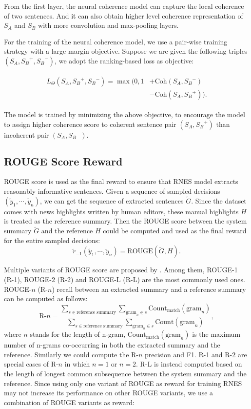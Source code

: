 	From the first layer, the neural coherence model can capture the local coherence of two sentences.  And it can also obtain higher level coherence representation of $S_A$ and $S_B$ with more convolution and max-pooling layers.

	For the training of the neural coherence model, we use a pair-wise training strategy with a large margin objective. Suppose we are given the following triples $(S_A, {S_B}^{+},{S_B}^{-})$, we adopt the ranking-based loss as objective:

\begin{align*}
	\begin{split}
	L_\Theta({S_A}, {S_B}^+, {S_B}^-) = 
	\max(0, 1 &+\text{Coh}({S_A, {S_B}^-})\\
	&-\text{Coh}({S_A}, {S_B}^+)).
	\end{split}

	\end{align*}

	The model is trained by minimizing the above objective, to encourage the model to assign higher coherence score to coherent sentence pair $(S_A, {S_B}^+)$ than incoherent pair $({S_A}, {S_B}^-)$.

	\subsection{ROUGE Score Reward}
	\label{rsr}
	ROUGE score is used as the final reward to ensure that RNES model extracts reasonably informative sentences. Given a sequence of sampled decisions $(\tilde{y}_1, \cdots, \tilde{y}_n)$, we can get the sequence of extracted sentences $\tilde{G}$. Since the dataset comes with news highlights written by human editors, these manual highlights $H$ is treated as the reference summary. Then the ROUGE score between the system summary $\tilde{G}$ and the reference $H$  could be computed and used as the final reward for the entire sampled decisions:
	\[ \tilde{r}_{-1}(\tilde{y}_1, \cdots, \tilde{y}_n) = \text{ROUGE}(\tilde{G}, H). \]

	Multiple variants of ROUGE score are proposed by \cite{rouge}. Among them, ROUGE-1 (R-1), ROUGE-2 (R-2) and ROUGE-L (R-L) are the most commonly used ones. ROUGE-$n$ (R-$n$) recall between an extracted summary and a reference summary can be computed as follows:
	\[ \text{R-}n = \frac{\sum_{s\in\text{reference summary}} \sum_{\text{gram}_n \in s} \text{Count}_{\text{match}} (\text{gram}_n) }{\sum_{s\in\text{reference summary}} \sum_{\text{gram}_n \in s} \text{Count} (\text{gram}_n)} , \]
	where $n$ stands for the length of n-gram, $\text{Count}_{\text{match}} (\text{gram}_n)$ is the maximum number of n-grams co-occurring in both the extracted summary and the reference. Similarly we could compute the R-$n$ precision and F1. R-1 and R-2 are special cases of R-$n$ in which $n=1$ or $n=2$. R-L is instead computed based on the length of longest common subsequence between the system summary and the reference. Since using only one variant of ROUGE as reward for training RNES may not increase its performance on other ROUGE variants, we use a combination of ROUGE variants as reward:

